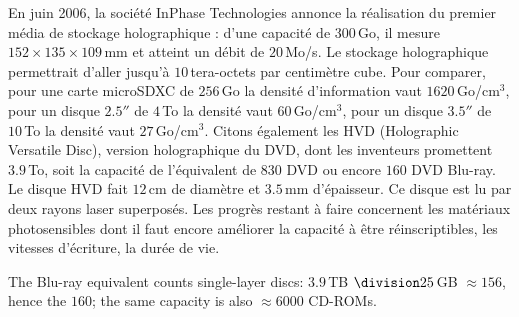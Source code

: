 \begin{example}
  En juin 2006, la société InPhase Technologies annonce la réalisation du
  premier média de stockage holographique : d'une capacité de $300\,$Go, il
  mesure $152\times135\times109\,$mm et atteint un débit de $20\,$Mo/s. Le
  stockage holographique permettrait d'aller jusqu'à $10\,$tera-octets par
  centimètre cube. Pour comparer, pour une carte microSDXC de $256\,$Go la
  densité d'information vaut $1620\,$Go/cm$^3$, pour un disque $2.5''$ de
  $4\,$To la densité vaut $60\,$Go/cm$^3$, pour un disque $3.5''$ de $10\,$To la
  densité vaut $27\,$Go/cm$^3$. Citons également les HVD (Holographic Versatile
  Disc), version holographique du DVD, dont les inventeurs promettent $3.9\,$To,
  soit la capacité de l'équivalent de $830$ DVD ou encore $160$ DVD Blu-ray. Le
  disque HVD fait $12\,$cm de diamètre et $3.5\,$mm d'épaisseur. Ce disque est
  lu par deux rayons laser superposés. Les progrès restant à faire concernent
  les matériaux photosensibles dont il faut encore améliorer la capacité à être
  réinscriptibles, les vitesses d'écriture, la durée de vie.
\end{example}

\begin{remark}
  The Blu-ray equivalent counts single-layer discs:
  $3.9\,$TB $\division 25\,$GB $\approx 156$, hence the $160$; the same capacity
  is also ${\approx}6000$ CD-ROMs.
\end{remark}

